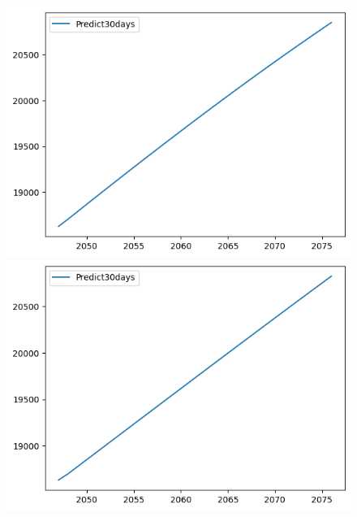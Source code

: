 \begin{figure}[H]
\begin{minipage}{0.15\textwidth}
    \includegraphics[width=1\textwidth]{resources/chapter-5/predicted/EXIM-GRU_7-3_30days.png}
    \end{minipage}
    \hfill
    \begin{minipage}{0.15\textwidth}
    \centering
    \includegraphics[width=1\textwidth]{resources/chapter-5/predicted/EXIM-GRU_8-2_30days.png}
    \end{minipage}
    \hfill
        \begin{minipage}{0.15\textwidth}
    \centering

\end{minipage}
\end{figure}
